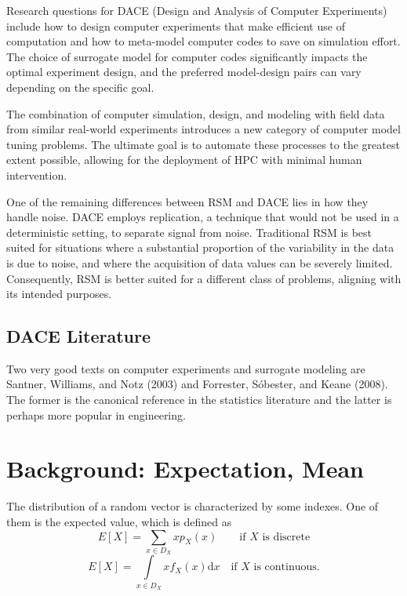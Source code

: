 \documentclass[
  letterpaper,
  DIV=11,
  numbers=noendperiod]{scrreprt}
\begin{document}
Research questions for DACE (Design and Analysis of Computer
Experiments) include how to design computer experiments that make
efficient use of computation and how to meta-model computer codes to
save on simulation effort. The choice of surrogate model for computer
codes significantly impacts the optimal experiment design, and the
preferred model-design pairs can vary depending on the specific goal.

The combination of computer simulation, design, and modeling with field
data from similar real-world experiments introduces a new category of
computer model tuning problems. The ultimate goal is to automate these
processes to the greatest extent possible, allowing for the deployment
of HPC with minimal human intervention.

One of the remaining differences between RSM and DACE lies in how they
handle noise. DACE employs replication, a technique that would not be
used in a deterministic setting, to separate signal from noise.
Traditional RSM is best suited for situations where a substantial
proportion of the variability in the data is due to noise, and where the
acquisition of data values can be severely limited. Consequently, RSM is
better suited for a different class of problems, aligning with its
intended purposes.

\hypertarget{dace-literature}{%
\subsection{DACE Literature}\label{dace-literature}}

Two very good texts on computer experiments and surrogate modeling are
Santner, Williams, and Notz (2003) and Forrester, Sóbester, and Keane
(2008). The former is the canonical reference in the statistics
literature and the latter is perhaps more popular in engineering.

\hypertarget{background-expectation-mean}{%
\section{Background: Expectation,
Mean}\label{background-expectation-mean}}

The distribution of a random vector is characterized by some indexes.
One of them is the expected value, which is defined as \[
E[X] = \sum_{x \in D_X} xp_X(x)  \qquad \text{if $X$ is discrete}
\] \[
E[X] = \int\limits_{x \in D_X} xf_X(x)\mathrm{d}x  \quad  \text{if $X$ is continuous.}
\]
\end{document}
